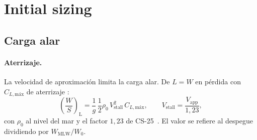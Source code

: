 \documentclass[11pt,a4paper]{article}
\newcommand{\WO}{W_0}
\begin{document}
\section{Initial sizing}

\subsection{Carga alar}

\paragraph{Aterrizaje.} La velocidad de aproximación limita la carga alar. De
$L=W$ en pérdida con $C_{L,\text{máx}}$ de aterrizaje \cite[ec.~5.6]{raymer6}:
\begin{equation}
  \left(\frac{W}{S}\right)_\text{L} = \frac{1}{g}\,\frac{1}{2}\rho_0\,
  V_\text{stall}^2\,C_{L,\text{máx}},
  \qquad V_\text{stall} = \frac{V_\text{app}}{1{,}23},
\end{equation}
con $\rho_0$ al nivel del mar y el factor $1{,}23$ de CS-25~\cite{cs25}. El
valor se refiere al despegue dividiendo por $W_\text{MLW}/\WO$.
\end{document}
